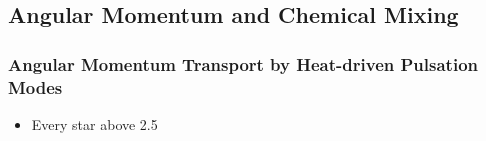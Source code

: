 
\subsection{Angular Momentum and Chemical Mixing}


{\color{brown}
\subsubsection{Angular Momentum Transport by Heat-driven Pulsation Modes}

\begin{itemize}
\item Every star above 2.5\,\Msun
\end{itemize}


}



